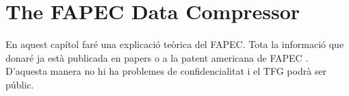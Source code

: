 \chapter{The FAPEC Data Compressor}
En aquest capítol faré una explicació teòrica del FAPEC. Tota la informació que donaré ja està publicada en papers \parencite{PaperFAPEC} o a la patent americana de FAPEC \parencite{PatentFAPEC}. D'aquesta manera no hi ha problemes de confidencialitat i el TFG podrà ser públic.